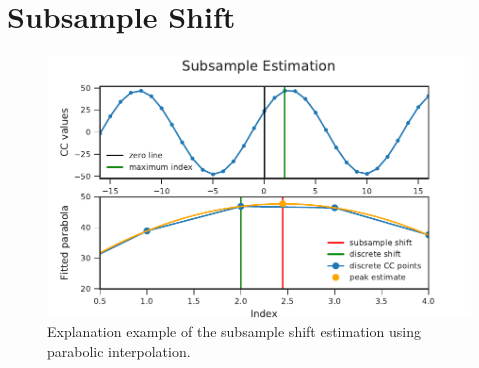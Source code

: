 \section{Subsample Shift}
\label{sec:02_subsampleShift}

\begin{figure}[ht]
	\centering
		\includegraphics[]{figures/subsample_shift}
	\caption{Explanation example of the subsample shift estimation using parabolic interpolation.}
    \label{fig:02_subsampleShift}
\end{figure}
